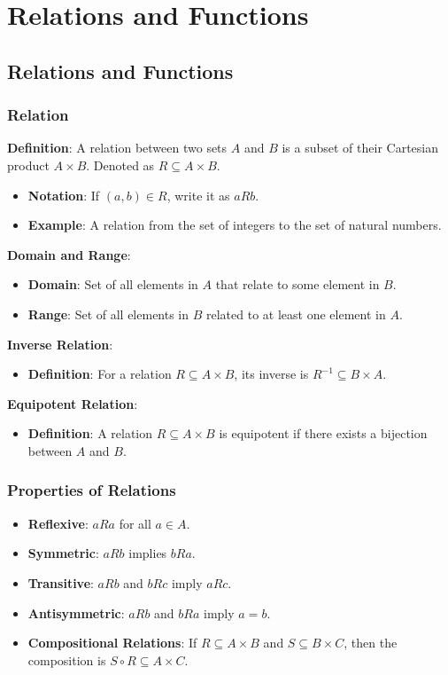 \section{Relations and Functions}

\subsection{Relations and Functions}

\subsubsection*{Relation}
\textbf{Definition}: A relation between two sets $A$ and $B$ is a subset of their Cartesian product $A \times B$. Denoted as $R \subseteq A \times B$.
\begin{itemize}
    \item \textbf{Notation}: If $(a, b) \in R$, write it as $a R b$.
    \item \textbf{Example}: A relation from the set of integers to the set of natural numbers.
\end{itemize}

\textbf{Domain and Range}:
\begin{itemize}
    \item \textbf{Domain}: Set of all elements in $A$ that relate to some element in $B$.
    \item \textbf{Range}: Set of all elements in $B$ related to at least one element in $A$.
\end{itemize}

\textbf{Inverse Relation}:
\begin{itemize}
    \item \textbf{Definition}: For a relation $R \subseteq A \times B$, its inverse is $R^{-1} \subseteq B \times A$.
\end{itemize}

\textbf{Equipotent Relation}:
\begin{itemize}
    \item \textbf{Definition}: A relation $R \subseteq A \times B$ is equipotent if there exists a bijection between $A$ and $B$.
\end{itemize}

\subsubsection*{Properties of Relations}
\begin{itemize}
    \item \textbf{Reflexive}: $a R a$ for all $a \in A$.
    \item \textbf{Symmetric}: $a R b$ implies $b R a$.
    \item \textbf{Transitive}: $a R b$ and $b R c$ imply $a R c$.
    \item \textbf{Antisymmetric}: $a R b$ and $b R a$ imply $a = b$.
    \item \textbf{Compositional Relations}: If $R \subseteq A \times B$ and $S \subseteq B \times C$, then the composition is $S \circ R \subseteq A \times C$.
\end{itemize}

